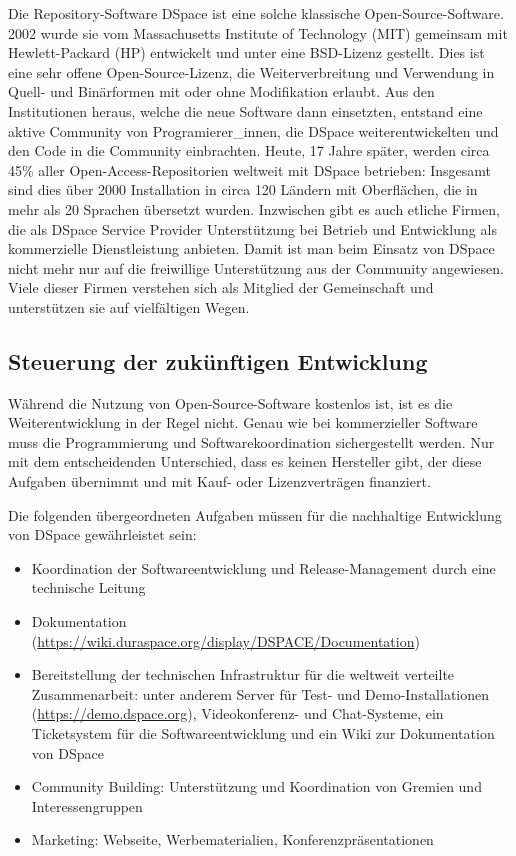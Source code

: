 \documentclass[a4paper,
fontsize=11pt,
oneside,
numbers=noperiodatend,
parskip=half-,
bibliography=totoc,
final
]{scrartcl}
\begin{document}
Die Repository-Software DSpace ist eine solche klassische
Open-Source-Software. 2002 wurde sie vom Massachusetts Institute of
Technology (MIT) gemeinsam mit Hewlett-Packard (HP) entwickelt und unter
eine BSD-Lizenz gestellt. Dies ist eine sehr offene Open-Source-Lizenz,
die Weiterverbreitung und Verwendung in Quell- und Binärformen mit oder
ohne Modifikation erlaubt. Aus den Institutionen heraus, welche die neue
Software dann einsetzten, entstand eine aktive Community von
Programierer\_innen, die DSpace weiterentwickelten und den Code in die
Community einbrachten. Heute, 17 Jahre später, werden circa 45\% aller
Open-Access-Repositorien weltweit mit DSpace betrieben: Insgesamt sind
dies über 2000 Installation in circa 120 Ländern mit Oberflächen, die in
mehr als 20 Sprachen übersetzt wurden. Inzwischen gibt es auch etliche
Firmen, die als DSpace Service Provider Unterstützung bei Betrieb und
Entwicklung als kommerzielle Dienstleistung anbieten. Damit ist man beim
Einsatz von DSpace nicht mehr nur auf die freiwillige Unterstützung aus
der Community angewiesen. Viele dieser Firmen verstehen sich als
Mitglied der Gemeinschaft und unterstützen sie auf vielfältigen Wegen.

\hypertarget{steuerung-der-zukuxfcnftigen-entwicklung}{%
\subsection{Steuerung der zukünftigen
Entwicklung}\label{steuerung-der-zukuxfcnftigen-entwicklung}}

Während die Nutzung von Open-Source-Software kostenlos ist, ist es die
Weiterentwicklung in der Regel nicht. Genau wie bei kommerzieller
Software muss die Programmierung und Softwarekoordination sichergestellt
werden. Nur mit dem entscheidenden Unterschied, dass es keinen
Hersteller gibt, der diese Aufgaben übernimmt und mit Kauf- oder
Lizenzverträgen finanziert.

Die folgenden übergeordneten Aufgaben müssen für die nachhaltige
Entwicklung von DSpace gewährleistet sein:

\begin{itemize}
\item
  Koordination der Softwareentwicklung und Release-Management durch eine
  technische Leitung
\item
  Dokumentation
  (\url{https://wiki.duraspace.org/display/DSPACE/Documentation})
\item
  Bereitstellung der technischen Infrastruktur für die weltweit
  verteilte Zusammenarbeit: unter anderem Server für Test- und
  Demo-Installationen
  (\href{https://demo.dspace.org/}{https://demo.dspace.org}),
  Vi\-deokonferenz- und Chat-Systeme, ein Ticketsystem für die
  Softwareentwicklung und ein Wiki zur Dokumentation von DSpace
\item
  Community Building: Unterstützung und Koordination von Gremien und
  Interessengruppen
\item
  Marketing: Webseite, Werbematerialien, Konferenzpräsentationen
\end{itemize}
\end{document}
